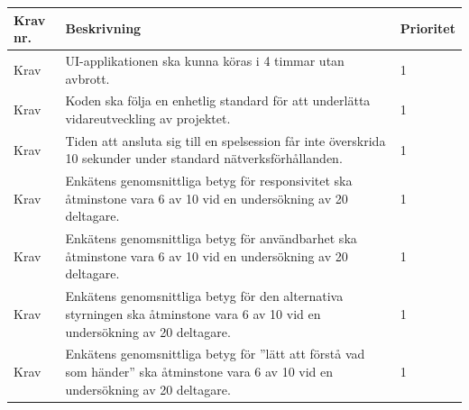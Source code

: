 \documentclass[10pt]{article}
\newcounter{indexcounter}
\newcommand{\Krav}[2]{
	\stepcounter{indexcounter}
	Krav \arabic{indexcounter} & #1 & #2 \\ \hline
}
\begin{document}
		\begin{tabular}{|p{2cm}|p{8cm}|p{2cm}|}
		\hline
		\textbf{Krav nr.} & \textbf{Beskrivning} & \textbf{Prioritet} \\ \hline
		
		\Krav{UI-applikationen ska kunna köras i 4 timmar utan avbrott.}{1}
		\Krav{Koden ska följa en enhetlig standard för att underlätta vidareutveckling av projektet.}{1}
		\Krav{Tiden att ansluta sig till en spelsession får inte överskrida 10 sekunder under standard nätverksförhållanden.}{1}
        \Krav{Enkätens\cite{bib-kvalitetsplan} genomsnittliga betyg för responsivitet ska åtminstone vara 6 av 10 vid en undersökning av 20 deltagare.}{1}
		\Krav{Enkätens\cite{bib-kvalitetsplan} genomsnittliga betyg för användbarhet ska åtminstone vara 6 av 10 vid en undersökning av 20 deltagare.}{1}
		\Krav{Enkätens\cite{bib-kvalitetsplan} genomsnittliga betyg för den alternativa styrningen ska åtminstone vara 6 av 10 vid en undersökning av 20 deltagare.}{1}
		\Krav{Enkätens\cite{bib-kvalitetsplan} genomsnittliga betyg för ''lätt att förstå vad som händer'' ska åtminstone vara 6 av 10 vid en undersökning av 20 deltagare.}{1}
				
	\end{tabular}
	

\pagebreak

\printbibliography
{}
\end{document}
